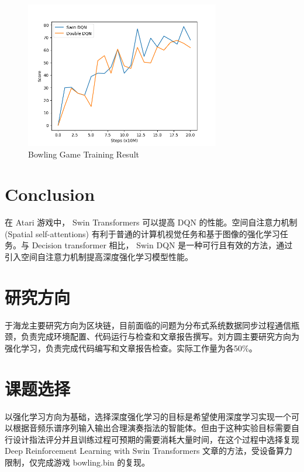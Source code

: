 \documentclass[final,1p,12pt,UTF8,review]{elsarticle}
\begin{document}
\begin{figure}[htp]
    \centerline{\includegraphics[width=8.5cm]{result.png}}
    \caption{Bowling Game Training Result\label{bowling}}
\end{figure}

\section{Conclusion}
在 Atari 游戏中， Swin Transformers 可以提高 DQN 的性能。空间自注意力机制 (Spatial self-attentions) 有利于普通的计算机视觉任务和基于图像的强化学习任务。与 Decision transformer 相比， Swin DQN 是一种可行且有效的方法，通过引入空间自注意力机制提高深度强化学习模型性能。

%  
% 




\newpage
\appendix
\section{研究方向}
于海龙主要研究方向为区块链，目前面临的问题为分布式系统数据同步过程通信瓶颈，负责完成环境配置、代码运行与检查和文章报告撰写。刘方圆主要研究方向为强化学习，负责完成代码编写和文章报告检查。实际工作量为各50\%。
\section{课题选择}
以强化学习方向为基础，选择深度强化学习的目标是希望使用深度学习实现一个可以根据音频乐谱序列输入输出合理演奏指法的智能体。但由于这种实验目标需要自行设计指法评分并且训练过程可预期的需要消耗大量时间，在这个过程中选择复现 Deep Reinforcement Learning with Swin Transformers 文章的方法，受设备算力限制，仅完成游戏 bowling.bin 的复现。
\end{document}
